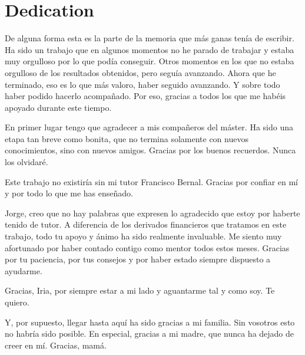 \chapter*{Dedication}
De alguna forma esta es la parte de la memoria que más ganas tenía de escribir.
Ha sido un trabajo que en algunos momentos no he parado de trabajar y estaba muy orgulloso por lo que podía conseguir. Otros momentos en los que no estaba orgulloso de los resultados obtenidos, pero seguía avanzando. 
Ahora que he terminado, eso es lo que más valoro, haber seguido avanzando.
Y sobre todo haber podido hacerlo acompañado. 
Por eso, gracias a todos los que me habéis apoyado durante este tiempo.

En primer lugar tengo que agradecer a mis compañeros del máster. 
Ha sido una etapa tan breve como bonita, que no termina solamente con nuevos conocimientos, sino con nuevos amigos. 
Gracias por los buenos recuerdos. Nunca los olvidaré.

Este trabajo no existiría sin mi tutor Francisco Bernal.
Gracias por confiar en mí y por todo lo que me has enseñado.

Jorge, creo que no hay palabras que expresen lo agradecido que estoy por haberte tenido de tutor. 
A diferencia de los derivados financieros que tratamos en este trabajo, todo tu apoyo y ánimo ha sido realmente invaluable.
Me siento muy afortunado por haber contado contigo como mentor todos estos meses.
Gracias por tu paciencia, por tus consejos y por haber estado siempre dispuesto a ayudarme.

Gracias, Iria, por siempre estar a mi lado y aguantarme tal y como soy. Te quiero.

Y, por supuesto, llegar hasta aquí ha sido gracias a mi familia. 
Sin vosotros esto no habría sido posible. 
En especial, gracias a mi madre, que nunca ha dejado de creer en mí.
Gracias, mamá.  
